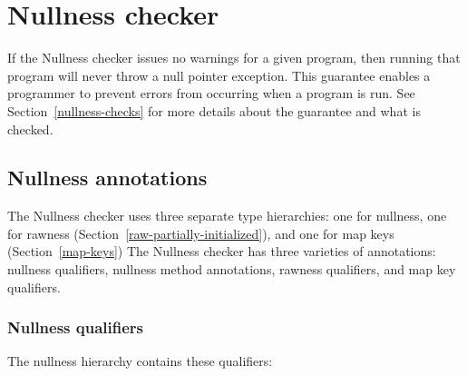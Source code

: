 \htmlhr
\chapter{Nullness checker\label{nullness-checker}}

If the Nullness checker issues no warnings for a given program, then
running that program will never throw a null pointer exception.  This
guarantee enables a programmer to prevent errors from occurring when a
program is run.  See Section~\ref{nullness-checks} for more details about
the guarantee and what is checked.


\section{Nullness annotations\label{nullness-annotations}}

The Nullness checker uses three separate type hierarchies:  one for nullness,
one for rawness (Section~\ref{raw-partially-initialized}),
and one for map keys (Section~\ref{map-keys})
The Nullness checker has three varieties of annotations:  nullness
qualifiers, nullness method annotations, rawness qualifiers, and map key
qualifiers.

\subsection{Nullness qualifiers\label{nullness-qualifiers}}

The nullness hierarchy contains these qualifiers:

